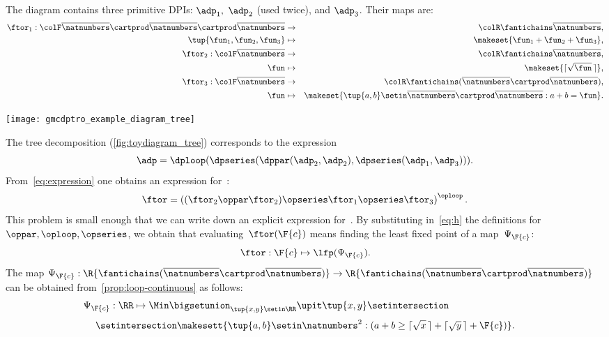 The diagram contains three primitive DPIs: $\adp_{1},$ $\adp_{2}$ (used twice), and $\adp_{3}$.
Their \ftor maps are:
\begin{eqnarray*}
    \ftor_{1}:{\colF\overline{\natnumbers}\cartprod\overline{\natnumbers}\cartprod\overline{\natnumbers}} & \rightarrow & {\colR\fantichains\overline{\natnumbers}},\\
    \tup{ \fun_{1},\fun_{2},\fun_{3}}  & \mapsto & \makeset{\fun_{1}+\fun_{2}+\fun_{3}},\\
    \ftor_{2}:{\colF\overline{\natnumbers}} & \rightarrow & {\colR\fantichains\overline{\natnumbers}},\\
    \fun& \mapsto & \makeset{\lceil\sqrt{\fun}\,\rceil},\\
    \ftor_{3}:{\colF\overline{\natnumbers}} & \rightarrow & {\colR\fantichains(\overline{\natnumbers}\cartprod\overline{\natnumbers})},\\
    \fun& \mapsto & \makeset{\tup{ a,b} \setin\overline{\natnumbers}\cartprod\overline{\natnumbers}:a+b=\fun}.
\end{eqnarray*}
\begin{marginfigure}
    \texttt{[image: gmcdptro\_example\_diagram\_tree]}
    \caption{}
    \label{fig:toydiagram_tree}
\end{marginfigure}
The tree decomposition (\cref{fig:toydiagram_tree}) corresponds to the expression
\begin{equation}
    \adp=\dploop(\dpseries(\dppar(\adp_{2},\adp_{2}),\dpseries(\adp_{1},\adp_{3}))).
    \label{eq:expression}
\end{equation}
From~\cref{eq:expression} one obtains an expression for~\ftor:
\begin{equation}
    \ftor=\left((\ftor_{2}\oppar\ftor_{2})\opseries\ftor_{1}\opseries\ftor_{3}\right)^{\oploop}.
    \label{eq:h}
\end{equation}
This problem is small enough that we can write down an explicit expression for~\ftor.
By substituting in~\cref{eq:h} the definitions for $\oppar, \oploop, \opseries$, we obtain that evaluating~$\ftor(\F{c})$ means finding the least fixed point of a map~$\Psi_{\F{c}}$:
\begin{equation*}
    \ftor:\F{c}\mapsto\lfp(\Psi_{\F{c}}).
\end{equation*}
The map $\Psi_{\F{c}}:\R{\fantichains(\overline{\natnumbers}\cartprod\overline{\natnumbers})}\rightarrow\R{\fantichains(\overline{\natnumbers}\cartprod\overline{\natnumbers})}$ can be obtained from~\cref{prop:loop-continuous} as follows:
%
\begin{equation}
    \Psi_{\F{c}}:\RR\mapsto\Min\bigsetunion_{\tup{ x,y} \setin\RR}\upit\tup{ x,y} \setintersection\qquad\qquad\qquad\qquad
\end{equation}
%
\begin{equation}
    \setintersection \makesett{
        \tup{ a,b} \setin\natnumbers^{2}:
        (
        a+b\geq\lceil\sqrt{x}\,\rceil+\lceil\sqrt{y}\,\rceil+\F{c}
        )
    }.
\end{equation}
%

